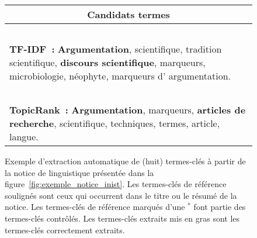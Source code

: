 \begin{figure}
\begin{minipage}{\linewidth}
{{\begin{tabular}{lll}
              \multicolumn{3}{c}{Candidats termes}\\
              \hline~\vspace{-0.75em}\\
              \multicolumn{3}{p{.975\linewidth}}{\textbf{TF-IDF~:}
                \textbf{Argumentation},
                scientifique,
                tradition scientifique,
                \textbf{discours scientifique},
                marqueurs,
                microbiologie,
                néophyte,
                marqueurs d' argumentation.
              }\\~\vspace{-0.75em}\\
              \multicolumn{3}{p{.975\linewidth}}{\textbf{TopicRank~:}
                \textbf{Argumentation},
                marqueurs,
                \textbf{articles de recherche},
                scientifique,
                techniques,
                termes,
                article,
                langue.
              }\\
            \end{tabular}
          }
        }
      \end{minipage}
      \caption{Exemple d'extraction automatique de (huit) termes-clés à partir
               de la notice de linguistique présentée dans la
               figure~\ref{fig:exemple_notice_inist}. Les termes-clés de
               référence soulignés sont ceux qui occurrent dans le titre ou le résumé de la
               notice. Les termes-clés de référence marqués d'une $^*$ font partie des
               termes-clés contrôlés. Les termes-clés extraits mis en gras sont
               les termes-clés correctement extraits.
               \label{fig:exemple_extraction}}
    \end{figure}

